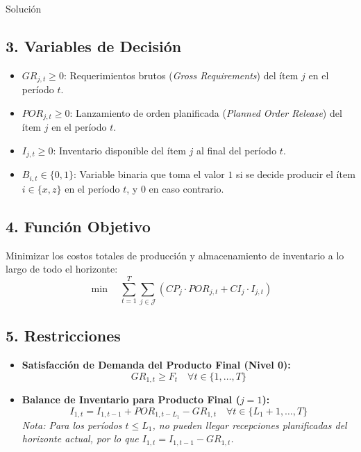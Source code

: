 \documentclass[11pt, a4paper]{article}
\begin{document}
\begin{ejercicio}{Solución}
  \subsection*{3. Variables de Decisión}
  \begin{itemize}
    \item $GR_{j,t} \ge 0$: Requerimientos brutos (\textit{Gross Requirements}) del ítem $j$ en el período $t$.
    \item $POR_{j,t} \ge 0$: Lanzamiento de orden planificada (\textit{Planned Order Release}) del ítem $j$ en el período $t$.
    \item $I_{j,t} \ge 0$: Inventario disponible del ítem $j$ al final del período $t$.
    \item $B_{i,t} \in \{0, 1\}$: Variable binaria que toma el valor $1$ si se decide producir el ítem $i \in \{x, z\}$ en el período $t$, y $0$ en caso contrario.
  \end{itemize}

  \subsection*{4. Función Objetivo}
  Minimizar los costos totales de producción y almacenamiento de inventario a lo largo de todo el horizonte:
  \begin{equation*}
    \min \quad \sum_{t=1}^{T} \sum_{j \in \mathcal{J}} \left( CP_j \cdot POR_{j,t} + CI_j \cdot I_{j,t} \right)
  \end{equation*}

  \subsection*{5. Restricciones}
  \begin{itemize}
    \item \textbf{Satisfacción de Demanda del Producto Final (Nivel 0):}
    \begin{equation}
      GR_{1,t} \ge F_t \quad \forall t \in \{1, \dots, T\}
    \end{equation}
    
    \item \textbf{Balance de Inventario para Producto Final ($j=1$):}
    \begin{equation}
      I_{1,t} = I_{1,t-1} + POR_{1,t-L_1} - GR_{1,t} \quad \forall t \in \{L_1 + 1, \dots, T\}
    \end{equation}
    \textit{Nota: Para los períodos $t \le L_1$, no pueden llegar recepciones planificadas del horizonte actual, por lo que $I_{1,t} = I_{1,t-1} - GR_{1,t}$.}


\end{itemize}
\end{ejercicio}
\end{document}
